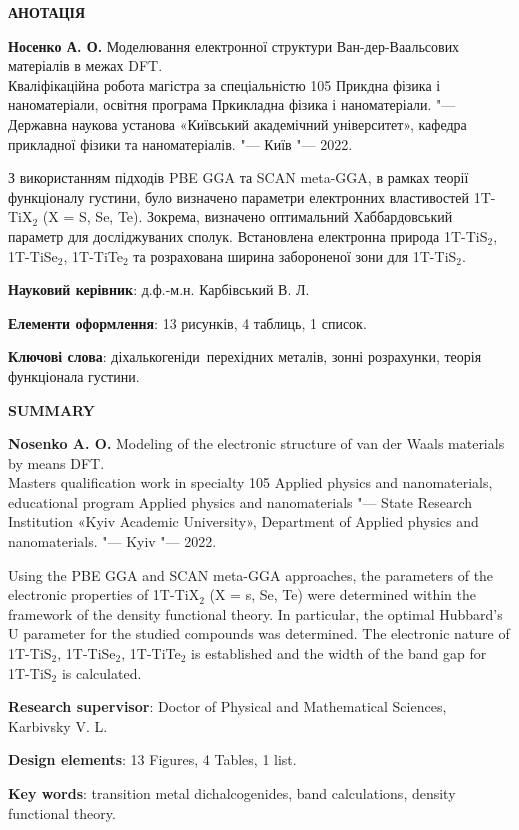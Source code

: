 \begin{center}
{\large \textbf{АНОТАЦІЯ}}
\end{center}

\textbf{Носенко А. О.} Моделювання електронної структури Ван-дер-Ваальсових матеріалів в межах DFT. \\
Кваліфікаційна робота магістра за спеціальністю 105 Прикдна фізика і наноматеріали, освітня програма Пркикладна фізика і наноматеріали. 
"--- Державна наукова установа «Київський академічний університет», кафедра прикладної фізики та наноматеріалів. "--- Київ "--- 2022.

З використанням підходів PBE GGA та SCAN meta-GGA, в рамках теорії функціоналу густини, було визначено параметри електронних властивостей 1T-TiX$_2$ (X = S, Se, Te). Зокрема, визначено оптимальний Хаббардовський параметр для досліджуваних сполук. Встановлена електронна природа 1T-TiS$_2$, 1T-TiSe$_2$, 1T-TiTe$_2$ та розрахована ширина забороненої зони для 1T-TiS$_2$.  

\textbf{Науковий керівник}: д.ф.-м.н. Карбівський В. Л.

\textbf{Елементи оформлення}: 13 рисунків, 4 таблиць, 1 список.

\textbf{Ключові слова}: діхалькогеніди перехідних металів, зонні розрахунки, теорія функціонала густини.



\bigskip

\clearpage

\thispagestyle{empty}
\begin{center}
{\large \textbf{SUMMARY}}
\end{center}

\textbf{Nosenko A. O.} Modeling of the electronic structure of van der Waals materials by means DFT. \\
Masters qualification work in specialty 105 Applied physics and nanomaterials, educational program Applied physics and nanomaterials "--- State Research Institution «Kyiv Academic University», Department of Applied physics and nanomaterials. "--- Kyiv "--- 2022.

Using the PBE GGA and SCAN meta-GGA approaches, the parameters of the electronic properties of 1T-TiX$_2$ (X = s, Se, Te) were determined within the framework of the density functional theory. In particular, the optimal Hubbard's U parameter for the studied compounds was determined. The electronic nature of 1T-TiS$_2$, 1T-TiSe$_2$, 1T-TiTe$_2$ is established and the width of the band gap for 1T-TiS$_2$ is calculated.

\textbf{Research supervisor}: Doctor of Physical and Mathematical Sciences, \\ Karbivsky V. L.

\textbf{Design elements}: 13 Figures, 4 Tables, 1 list.

\textbf{Key words}: transition metal dichalcogenides, band calculations, density functional theory.



